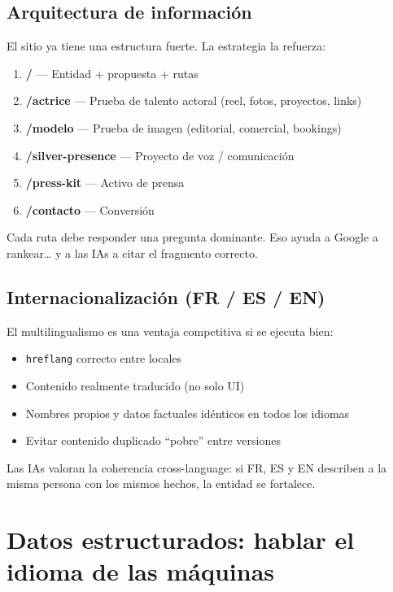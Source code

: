 \documentclass[11pt,a4paper]{article}
\begin{document}
\subsection{Arquitectura de información}
El sitio ya tiene una estructura fuerte. La estrategia la refuerza:

\begin{enumerate}
  \item \textbf{/} --- Entidad + propuesta + rutas
  \item \textbf{/actrice} --- Prueba de talento actoral (reel, fotos, proyectos, links)
  \item \textbf{/modelo} --- Prueba de imagen (editorial, comercial, bookings)
  \item \textbf{/silver-presence} --- Proyecto de voz / comunicación
  \item \textbf{/press-kit} --- Activo de prensa
  \item \textbf{/contacto} --- Conversión
\end{enumerate}

Cada ruta debe responder una pregunta dominante.
Eso ayuda a Google a rankear\ldots{} y a las IAs a citar el fragmento correcto.

\subsection{Internacionalización (FR / ES / EN)}
El multilingualismo es una ventaja competitiva si se ejecuta bien:

\begin{itemize}
  \item \texttt{hreflang} correcto entre locales
  \item Contenido realmente traducido (no solo UI)
  \item Nombres propios y datos factuales idénticos en todos los idiomas
  \item Evitar contenido duplicado ``pobre'' entre versiones
\end{itemize}

Las IAs valoran la coherencia cross-language: si FR, ES y EN describen a la misma persona
con los mismos hechos, la entidad se fortalece.

\section{Datos estructurados: hablar el idioma de las máquinas}
\end{document}
